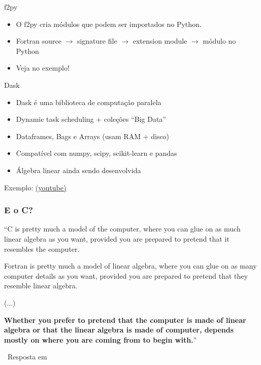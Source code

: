 \documentclass{beamer}
\begin{document}
\begin{darkframes}
  \begin{frame}{f2py}
    \begin{itemize}
    \item O f2py cria módulos que podem ser importados no Python.
    \item Fortran source $\rightarrow$ signature file $\rightarrow$ extension module $\rightarrow$ módulo no Python
    \item Veja no exemplo!
    \end{itemize}
  \end{frame}

  \begin{frame}{Dask}
    \begin{itemize}
    \item Dask é uma biblioteca de computação paralela
    \item Dynamic task scheduling + coleções “Big Data”
    \item Dataframes, Bags e Arrays (usam RAM + disco)
    \item Compatível com numpy, scipy, scikit-learn e pandas
    \item Álgebra linear ainda sendo desenvolvida
    \end{itemize}

    Exemplo: \href{https://www.youtube.com/watch?v=wANQkgDuTAk}{(youtube)}
  \end{frame}
  
      
  
  \begin{frame}
    \frametitle{E o C?}
    \begin{center}
      \begin{block}{}
        \small{``C is pretty much a model of the computer, where you can glue on as much linear algebra as you want, provided you are prepared to pretend that it resembles the computer.

        Fortran is pretty much a model of linear algebra, where you can glue on as many computer details as you want, provided you are prepared to pretend that they resemble linear algebra.

        (...)
        
        \textbf{Whether you prefer to pretend that the computer is made of linear algebra or that the linear algebra is made of computer, depends mostly on where you are coming from to begin with.}''}
      \end{block}
    \end{center}
    \begin{flushright}
      \vskip-0.7cm
      \hskip3cm \textemdash \ \footnotesize{Resposta em \cite{quora}}
    \end{flushright}
  \end{frame}
  

\end{darkframes}
\end{document}
